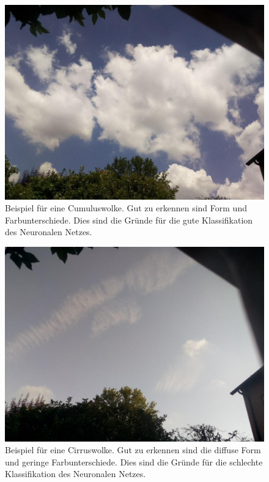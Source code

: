 \begin{figure}[ht]
  \centering
  \includegraphics[height=0.25\textheight]{content/cumulus.pdf}
  \caption{Beispiel für eine Cumuluswolke. Gut zu erkennen sind Form und Farbunterschiede. Dies
  sind die Gründe für die gute Klassifikation des Neuronalen Netzes.}
  \label{fig:cumulus}
\end{figure}

\begin{figure}[ht]
  \centering
  \includegraphics[height=0.25\textheight]{content/cirrus.pdf}
  \caption{Beispiel für eine Cirruswolke. Gut zu erkennen sind die diffuse Form und geringe Farbunterschiede. Dies
  sind die Gründe für die schlechte Klassifikation des Neuronalen Netzes.}
  \label{fig:cirrus}
\end{figure}
